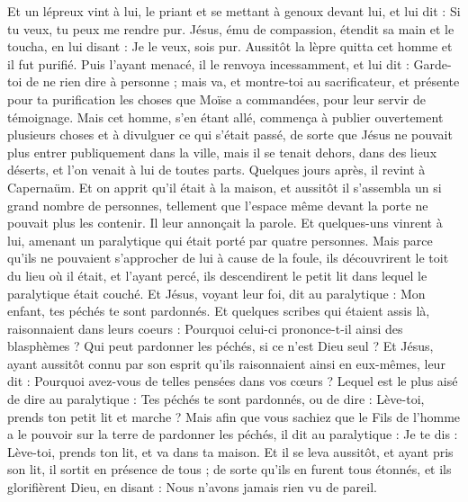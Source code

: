 \begin{multicols}{2}
Et un lépreux vint à lui, le priant et se mettant à genoux devant lui, et lui dit : Si tu veux, tu peux me rendre pur.
Jésus, ému de compassion, étendit sa main et le toucha, en lui disant : Je le veux, sois pur.
Aussitôt la lèpre quitta cet homme et il fut purifié.
Puis l'ayant menacé, il le renvoya incessamment,
et lui dit : Garde-toi de ne rien dire à personne ; mais va, et montre-toi au sacrificateur, et présente pour ta purification les choses que Moïse a commandées, pour leur servir de témoignage.
Mais cet homme, s'en étant allé, commença à publier ouvertement plusieurs choses et à divulguer ce qui s'était passé, de sorte que Jésus ne pouvait plus entrer publiquement dans la ville, mais il se tenait dehors, dans des lieux déserts, et l'on venait à lui de toutes parts.
\VerseOne{}Quelques jours après, il revint à Capernaüm. Et on apprit qu'il était à la maison,
et aussitôt il s'assembla un si grand nombre de personnes, tellement que l'espace même devant la porte ne pouvait plus les contenir. Il leur annonçait la parole.
Et quelques-uns vinrent à lui, amenant un paralytique qui était porté par quatre personnes.
Mais parce qu'ils ne pouvaient s'approcher de lui à cause de la foule, ils découvrirent le toit du lieu où il était, et l'ayant percé, ils descendirent le petit lit dans lequel le paralytique était couché.
Et Jésus, voyant leur foi, dit au paralytique : Mon enfant, tes péchés te sont pardonnés.
Et quelques scribes qui étaient assis là, raisonnaient dans leurs coeurs :
Pourquoi celui-ci prononce-t-il ainsi des blasphèmes ? Qui peut pardonner les péchés, si ce n'est Dieu seul ?
Et Jésus, ayant aussitôt connu par son esprit qu'ils raisonnaient ainsi en eux-mêmes, leur dit : Pourquoi avez-vous de telles pensées dans vos cœurs ?
Lequel est le plus aisé de dire au paralytique : Tes péchés te sont pardonnés, ou de dire : Lève-toi, prends ton petit lit et marche ?
Mais afin que vous sachiez que le Fils de l'homme a le pouvoir sur la terre de pardonner les péchés, il dit au paralytique :
Je te dis : Lève-toi, prends ton lit, et va dans ta maison.
Et il se leva aussitôt, et ayant pris son lit, il sortit en présence de tous ; de sorte qu'ils en furent tous étonnés, et ils glorifièrent Dieu, en disant : Nous n'avons jamais rien vu de pareil.

\end{multicols}
